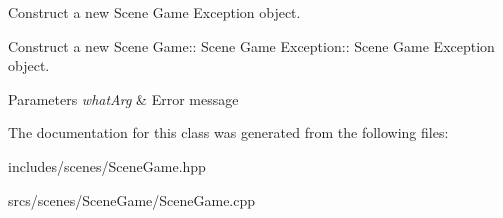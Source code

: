Construct a new Scene Game Exception object. 

Construct a new Scene Game\+:\+: Scene Game Exception\+:\+: Scene Game Exception object.


\begin{DoxyParams}{Parameters}
{\em what\+Arg} & Error message \\
\hline
\end{DoxyParams}


The documentation for this class was generated from the following files\+:\begin{DoxyCompactItemize}
\item 
includes/scenes/Scene\+Game.\+hpp\item 
srcs/scenes/\+Scene\+Game/Scene\+Game.\+cpp\end{DoxyCompactItemize}
